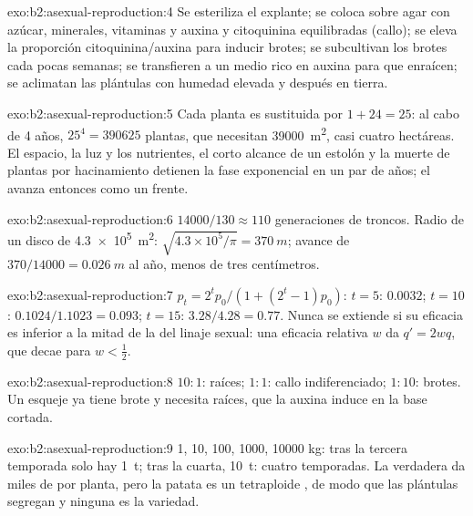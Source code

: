 \begin{solution}{exo:b2:asexual-reproduction:4}
Se esteriliza el explante; se coloca sobre agar con azúcar, minerales,
vitaminas y auxina y citoquinina equilibradas (callo); se eleva la
proporción citoquinina/auxina para inducir brotes; se subcultivan los
brotes cada pocas semanas; se transfieren a un medio rico en auxina para
que enraícen; se aclimatan las plántulas con humedad elevada y después en
tierra.
\end{solution}

\begin{solution}{exo:b2:asexual-reproduction:5}
Cada planta es sustituida por $1 + 24 = 25$: al cabo de 4 años, $25^{4} =
\num{390625}$ plantas, que necesitan \qty{39000}{m^2}, casi cuatro
hectáreas. El espacio, la luz y los nutrientes, el corto alcance de un
estolón y la muerte de plantas por hacinamiento detienen la fase
exponencial en un par de años; el  avanza entonces como un frente.
\end{solution}

\begin{solution}{exo:b2:asexual-reproduction:6}
$\num{14000}/130 \approx 110$ generaciones de troncos. Radio de un disco
de \qty{4.3e5}{m^2}: $\sqrt{4.3\times 10^{5}/\pi} = \qty{370}{m}$;
avance de $370/\num{14000} = \qty{0.026}{m}$ al año, menos de tres
centímetros.
\end{solution}

\begin{solution}{exo:b2:asexual-reproduction:7}
$p_t = 2^{t}p_0/(1 + (2^{t} - 1)p_0)$: $t = 5$: $0.0032$; $t = 10$:
$0.1024/1.1023 = 0.093$; $t = 15$: $3.28/4.28 = 0.77$. Nunca se extiende
si su eficacia es inferior a la mitad de la del linaje sexual: una
eficacia relativa $w$ da $q' = 2wq$, que decae para $w <
\tfrac12$.
\end{solution}

\begin{solution}{exo:b2:asexual-reproduction:8}
$10 : 1$: raíces; $1 : 1$: callo indiferenciado; $1 : 10$: brotes.
Un esqueje ya tiene brote y necesita raíces, que la auxina induce en la
base cortada.
\end{solution}

\begin{solution}{exo:b2:asexual-reproduction:9}
1, 10, 100, \num{1000}, \num{10000} kg: tras la tercera temporada solo
hay \qty{1}{t}; tras la cuarta, \qty{10}{t}: cuatro temporadas. La
 verdadera da miles de  por planta, pero la patata es un
tetraploide , de modo que las plántulas segregan y ninguna es
la variedad.
\end{solution}

